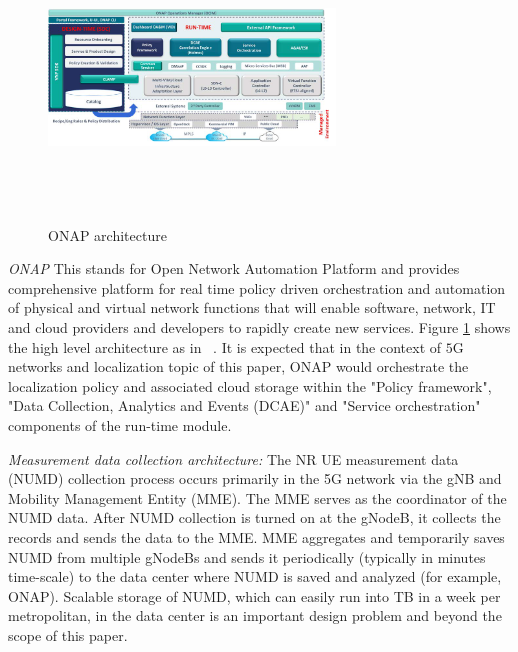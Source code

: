 \documentclass[conference, 10pt]{IEEEtran}
\begin{document}
\begin{NoHyper}

\begin{figure}[t]
\begin{center}
\includegraphics[height=3.0in,width=3.0in]{./ONAP-architecture.png}
\caption{\label{fig:onap_arch}
{\small ONAP architecture}}
\end{center}
\end{figure}




{\em ONAP} This stands for Open Network Automation Platform and provides comprehensive platform for real time policy driven orchestration and automation of physical and virtual network functions that will enable software, network,
IT and cloud providers and developers to rapidly create new services. Figure \ref{fig:onap_arch} shows the high level architecture as in ~\cite{ONAP}. It is expected that in the context of $5$G networks and localization topic of this paper, ONAP would orchestrate the localization policy and associated cloud storage within the "Policy framework", "Data Collection, Analytics and Events (DCAE)" and "Service orchestration" components of the run-time module. 


{\em Measurement data collection architecture:} The NR UE measurement data (NUMD) collection process occurs primarily in the 5G network via the gNB and Mobility Management Entity (MME). The MME serves as the coordinator of the NUMD data.
After NUMD collection is turned on at the gNodeB, it collects the records and sends
the data to the MME. MME aggregates and temporarily saves NUMD from multiple
gNodeBs and sends it periodically (typically in minutes time-scale) to the data
center  where NUMD is saved and analyzed (for example, ONAP). Scalable storage of NUMD, which can easily
run into TB in a week per metropolitan, in the data center is an important design
problem and beyond the scope of this paper.



\end{NoHyper}
\end{document}
